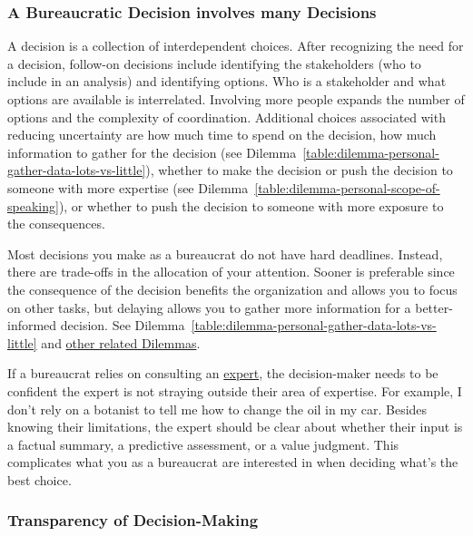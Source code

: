 \subsubsection{A Bureaucratic Decision involves many Decisions}

A decision is a collection of interdependent choices. After recognizing the need for a decision, follow-on decisions include identifying the stakeholders (who to include in an analysis) and identifying options. Who is a stakeholder and what options are available is interrelated. Involving more people expands the number of options and the complexity of coordination. Additional choices associated with reducing uncertainty are how much time to spend on the decision, how much information to gather for the decision (see Dilemma~\ref{table:dilemma-personal-gather-data-lots-vs-little}),
whether to make the decision or push the decision to someone with more expertise (see Dilemma~\ref{table:dilemma-personal-scope-of-speaking}), or whether to push the decision to someone with more exposure to the consequences.

Most decisions you make as a bureaucrat do not have hard deadlines. Instead, there are trade-offs in the allocation of your attention. Sooner is preferable since the consequence of the decision benefits the organization and allows you to focus on other tasks, but delaying allows you to gather more information for a better-informed decision. See 
Dilemma~\ref{table:dilemma-personal-gather-data-lots-vs-little}
and \hyperref[sec:dilemma-trilemma]{other related Dilemmas}.


If a bureaucrat relies on consulting an
\hyperref[sec:expertise]{expert},
the decision-maker needs to be confident the expert is not  straying outside their area of expertise. For example, I don't rely on a botanist  to tell me how to change the oil in my car. 
Besides knowing their limitations, the expert should be clear about whether their input is a factual summary, a predictive assessment, or a value judgment. This complicates what you as a bureaucrat are interested in when deciding what's the best choice.


\subsubsection{Transparency of Decision-Making\label{sec:transparency-of-decisions}}

